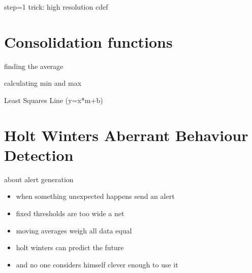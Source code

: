 \begin{frame}{step=1 trick: high resolution cdef}
\end{frame}


\section{Consolidation functions}

\begin{frame}{finding the average}
\end{frame}

\begin{frame}{calculating min and max}
\end{frame}




\begin{frame}{Least Squares Line (y=x*m+b)}
\end{frame}


\section{Holt Winters Aberrant Behaviour Detection}

\begin{frame}{about alert generation}
\begin{itemize}[<+-| alert@+>]
\item when something unexpected happens send an alert
\item fixed thresholds are too wide a net
\item moving averages weigh all data equal
\item holt winters can predict the future
\item and no one considers himself clever enough to use it
\end{itemize}
\end{frame}

